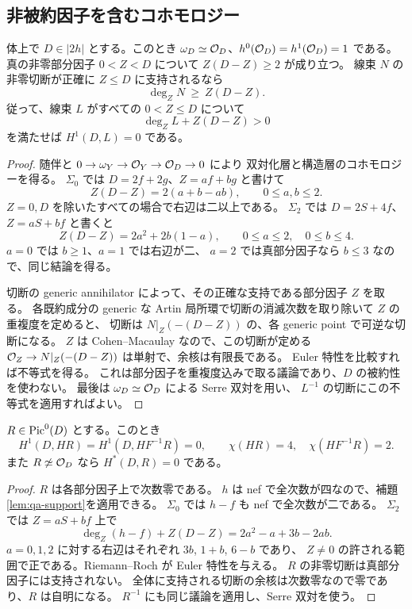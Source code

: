 \subsection{非被約因子を含むコホモロジー}

\begin{lemma}[支持に対する判定]
\label{lem:qa-support}
体上で $D\in|2h|$ とする。このとき
$\omega_D\simeq\mathcal O_D$、$h^0(\mathcal O_D)=h^1(\mathcal O_D)=1$ である。
真の非零部分因子 $0<Z<D$ について $Z(D-Z)\geq2$ が成り立つ。
線束 $N$ の非零切断が正確に $Z\leq D$ に支持されるなら
\[
 \deg_ZN\ \geq\ Z(D-Z).
\]
従って、線束 $L$ がすべての $0<Z\leq D$ について
\begin{equation}
 \deg_ZL+Z(D-Z)>0
 \label{eq:qa-support-vanishing}
\end{equation}
を満たせば $H^1(D,L)=0$ である。
\end{lemma}

\begin{proof}
随伴と $0\to\omega_Y\to\mathcal O_Y\to\mathcal O_D\to0$ により
双対化層と構造層のコホモロジーを得る。
$\Sigma _0$ では $D=2f+2g$、$Z=af+bg$ と書けて
\[
 Z(D-Z)=2(a+b-ab),\qquad 0\leq a,b\leq2.
\]
$Z=0,D$ を除いたすべての場合で右辺は二以上である。
$\Sigma _2$ では $D=2S+4f$、$Z=aS+bf$ と書くと
\[
 Z(D-Z)=2a^2+2b(1-a),\qquad0\leq a\leq2,\quad0\leq b\leq4.
\]
$a=0$ では $b\geq1$、$a=1$ では右辺が二、
$a=2$ では真部分因子なら $b\leq3$ なので、同じ結論を得る。

切断の generic annihilator によって、その正確な支持である部分因子 $Z$ を取る。
各既約成分の generic な Artin 局所環で切断の消滅次数を取り除いて $Z$ の重複度を定めると、
切断は $N|_Z(-(D-Z))$ の、各 generic point で可逆な切断になる。
$Z$ は Cohen--Macaulay なので、この切断が定める
$\mathcal O_Z\to N|_Z(-(D-Z))$ は単射で、余核は有限長である。
Euler 特性を比較すれば不等式を得る。
これは部分因子を重複度込みで取る議論であり、$D$ の被約性を使わない。
最後は $\omega_D\simeq\mathcal O_D$ による Serre 双対を用い、
$L^{-1}$ の切断にこの不等式を適用すればよい。
\end{proof}

\begin{lemma}[再埋め込みに必要な消滅]
\label{lem:qa-vanishing}
$R\in\operatorname{Pic}^0(D)$ とする。このとき
\[
 H^1(D,HR)=H^1(D,HF^{-1}R)=0,\qquad
 \chi(HR)=4,\quad\chi(HF^{-1}R)=2.
\]
また $R\not\simeq\mathcal O_D$ なら $H^*(D,R)=0$ である。
\end{lemma}

\begin{proof}
$R$ は各部分因子上で次数零である。
$h$ は nef で全次数が四なので、補題\ref{lem:qa-support}を適用できる。
$\Sigma _0$ では $h-f$ も nef で全次数が二である。
$\Sigma _2$ では $Z=aS+bf$ 上で
\[
 \deg_Z(h-f)+Z(D-Z)=2a^2-a+3b-2ab.
\]
$a=0,1,2$ に対する右辺はそれぞれ $3b$, $1+b$, $6-b$ であり、
$Z\neq0$ の許される範囲で正である。Riemann--Roch が Euler 特性を与える。
$R$ の非零切断は真部分因子には支持されない。
全体に支持される切断の余核は次数零なので零であり、$R$ は自明になる。
$R^{-1}$ にも同じ議論を適用し、Serre 双対を使う。
\end{proof}

